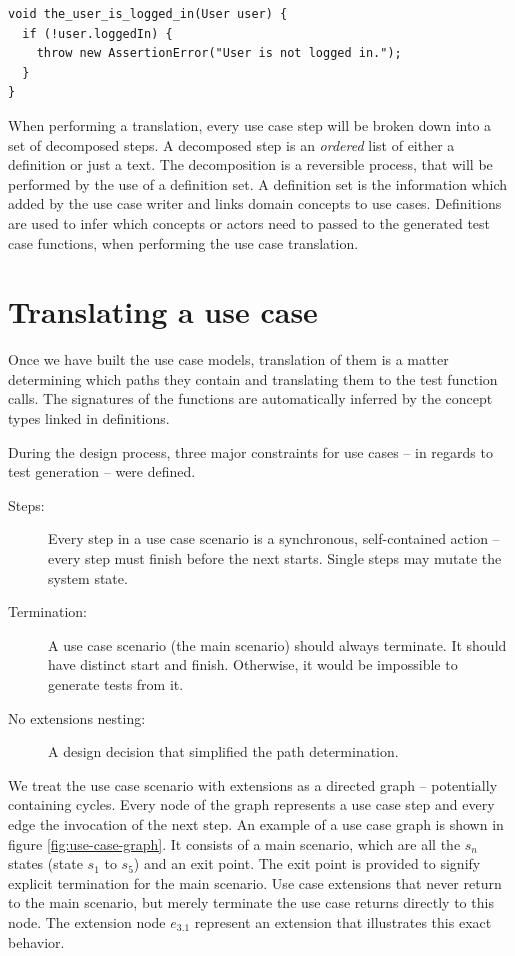 \begin{lstlisting}[style=Dart, caption=Example pre-/postcondition code mapping (written manually),label={lst:example-precondition-code}]
void the_user_is_logged_in(User user) {
  if (!user.loggedIn) {
    throw new AssertionError("User is not logged in."); 
  }
}
\end{lstlisting}

\noindent When performing a translation, every use case step will be broken down into a set of decomposed steps. A decomposed step is an \emph{ordered} list of either a definition or just a text. The decomposition is a reversible process, that will be performed by the use of a definition set. A definition set is the information which added by the use case writer and links domain concepts to use cases. Definitions are used to infer which concepts or actors need to passed to the generated test case functions, when performing the use case translation.

\section{Translating a use case}
Once we have built the use case models, translation of them is a matter determining which paths they contain and translating them to the test function calls. The signatures of the functions are automatically inferred by the concept types linked in definitions.\medskip

\noindent During the design process, three major constraints for use cases -- in regards to test generation -- were defined. 
\begin{description}
  \item[Steps:] Every step in a use case scenario is a synchronous, self-contained action -- every step must finish before the next starts. Single steps may mutate the system state.
  \item[Termination:] A use case scenario (the main scenario) should always terminate. It should have distinct start and finish. Otherwise, it would be impossible to generate tests from it.
  \item[No extensions nesting:] A design decision that simplified the path determination.
\end{description}
We treat the use case scenario with extensions as a directed graph -- potentially containing cycles. Every node of the graph represents a use case step and every edge the invocation of the next step. An example of a use case graph is shown in figure \ref{fig:use-case-graph}. It consists of a main scenario, which are all the $s_n$ states (state $s_1$ to $s_5$) and an exit point. The exit point is provided to signify explicit termination for the main scenario. Use case extensions that never return to the main scenario, but merely terminate the use case returns directly to this node. The extension node $e_{3.1}$ represent an extension that illustrates this exact behavior.\medskip

